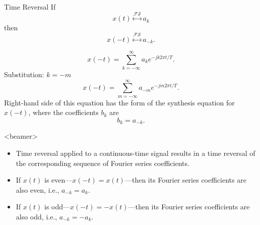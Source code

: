 \begin{frame}[plain]{Time Reversal}
    If
    \begin{equation*}
        x(t) \overset{\mathcal{FS}}{\longleftrightarrow} a_k
    \end{equation*}
    then
    \begin{equation*}
        x(-t) \overset{\mathcal{FS}}{\longleftrightarrow} a_{-k}.
    \end{equation*}
    {

        \begin{equation*}
            x(-t) =  \sum_{k=-\infty}^{\infty}a_ke^{-jk2\pi t/T}.
        \end{equation*}
        Substitution: $k=-m$
        \begin{equation*}
            x(-t) = \sum_{m=-\infty}^{\infty}a_{-m}e^{-jm2\pi t/T}.
        \end{equation*}
        Right-hand side of this equation has the form of the \fs synthesis equation for $x(-t)$, where the \fs coefficients  $b_k$ are
        \begin{equation*}
            b_k = a_{-k}.
        \end{equation*}

    }
\end{frame}

\begin{frame}<beamer>
    \begin{itemize}[<+->]
      \item Time reversal applied to a continuous-time signal results in a time reversal of the corresponding sequence of Fourier series coefficients.
      \item If $x(t)$ is even---$x(-t) = x(t)$---then its Fourier series coefficients are also even, i.e., $a_{-k}=a_k$.
      \item If $x(t)$ is odd---$x(-t) = -x(t)$---then its Fourier series coefficients are also odd, i.e., $a_{-k}=-a_k$.
    \end{itemize}
\end{frame}


